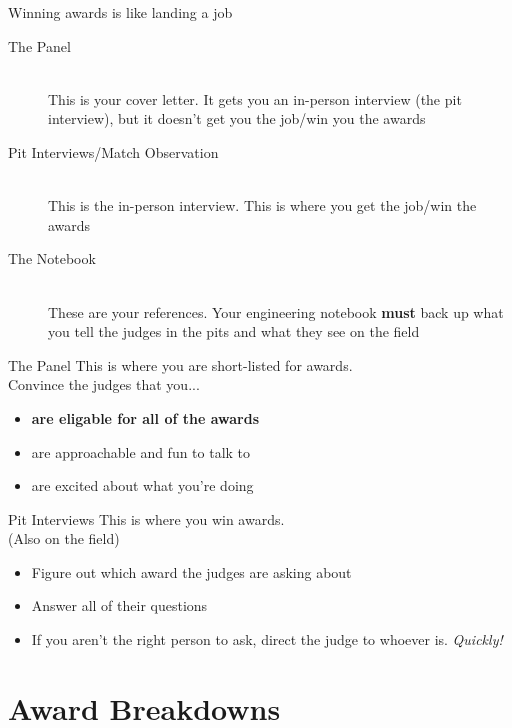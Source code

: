 \documentclass{beamer}
\begin{document}
  \begin{frame}{Winning awards is like landing a job}
    \begin{description}
    \item[The Panel] \hfill \\
      This is your cover letter. It gets you an in-person interview
      (the pit interview), but it doesn't get you the job/win you the awards
      \pause
    \item[Pit Interviews/Match Observation] \hfill \\
      This is the in-person interview. This is where you get the job/win
      the awards
      \pause
    \item[The Notebook] \hfill \\
      These are your references. Your engineering notebook \textbf{must}
      back up what you tell the judges in the pits and what they see
      on the field
    \end{description}
  \end{frame}

  \begin{frame}{The Panel}
    \large{This is where you are short-listed for awards.}
    \\
    \pause
    Convince the judges that you... \pause
    \begin{itemize}
    \item \textbf{are eligable for all of the awards} \pause
    \item are approachable and fun to talk to \pause
    \item are excited about what you're doing
    \end{itemize}
  \end{frame}

  \begin{frame}{Pit Interviews}
    \large{This is where you win awards.}
    \\
    \pause
    \small{(Also on the field)}
    \pause
    \begin{itemize}
    \item Figure out which award the judges are asking about \pause
    \item Answer all of their questions \pause
    \item If you aren't the right person to ask, direct the judge to whoever is.
      \pause
      \textit{Quickly!}
    \end{itemize}
  \end{frame}

  \section{Award Breakdowns}
\end{document}
